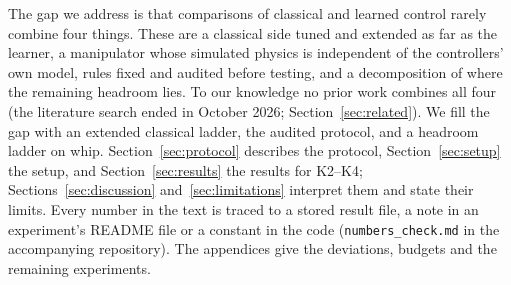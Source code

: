 The gap we address is that comparisons of classical and learned control rarely combine four things. These are a classical side tuned and extended as far as the learner, a manipulator whose simulated physics is independent of the controllers' own model, rules fixed and audited before testing, and a decomposition of where the remaining headroom lies. To our knowledge no prior work combines all four (the literature search ended in October 2026; Section~\ref{sec:related}). We fill the gap with an extended classical ladder, the audited protocol, and a headroom ladder on whip. Section~\ref{sec:protocol} describes the protocol, Section~\ref{sec:setup} the setup, and Section~\ref{sec:results} the results for K2--K4; Sections~\ref{sec:discussion} and~\ref{sec:limitations} interpret them and state their limits. Every number in the text is traced to a stored result file, a note in an experiment's README file or a constant in the code (\texttt{numbers\_check.md} in the accompanying repository). The appendices give the deviations, budgets and the remaining experiments.
